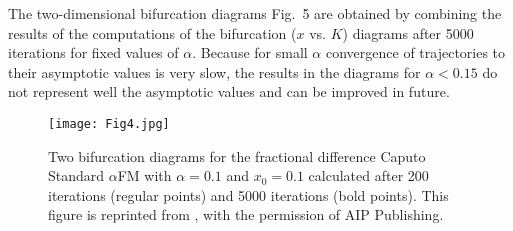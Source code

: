\documentclass[graybox]{svmult}
\begin{document}
The two-dimensional bifurcation diagrams 
Fig.~5 
are obtained by combining the results of the computations of the bifurcation ($x$ vs. $K$) diagrams after 5000 iterations for fixed values of $\alpha$. Because for small $\alpha$ convergence of trajectories to their asymptotic values is very slow, the results in the diagrams for $\alpha<0.15$ do not represent well the asymptotic values and can be improved in future.    
\begin{figure}[!t]
\centering
\texttt{[image: Fig4.jpg]}
\caption{Two bifurcation diagrams for the  fractional difference Caputo Standard
$\alpha$FM with   $\alpha=0.1$ and  $x_0=0.1$ calculated after 200
iterations (regular points) and 5000 iterations (bold points). This figure is reprinted from \cite{ME8}, with the permission of AIP Publishing.
}
\label{BifLT1shift}
\end{figure}
\end{document}
